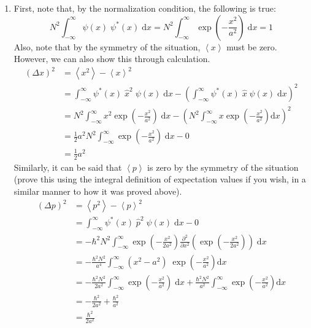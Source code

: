 \begin{sol}
\begin{enumerate}[label=\textbf{(\alph*)}]
\item First, note that, by the normalization condition, the following is true: $$N^2\int_{-\infty}^{\infty}\psi(x)\;\psi^*(x)\;\mathrm{d}x = N^2\int_{-\infty}^{\infty}\operatorname{exp}\left(-\frac{x^2}{a^2}\right)\;\mathrm{d}x = 1$$
Also, note that by the symmetry of the situation, $\left<x\right>$ must be zero. However, we can also show this through calculation.
\begin{align*}
    \left(\Delta x\right)^2 &= \left<x^2\right> - \left<x\right>^2\\ &= \int_{-\infty}^{\infty}\psi^*(x)\;\hat{x}^2\;\psi(x)\;\mathrm{d}x -\left(\int_{-\infty}^{\infty}\psi^*(x)\;\hat{x}\;\psi(x)\;\mathrm{d}x\right)^2\\ &= N^2\int_{-\infty}^{\infty}x^2\operatorname{exp}\left(-\frac{x^2}{a^2}\right)\;\mathrm{d}x -\left(N^2\int_{-\infty}^{\infty}x\operatorname{exp}\left(-\frac{x^2}{a^2}\right)\mathrm{d}x\right)^2\\ &= \frac{1}{2}a^2N^2\int_{-\infty}^{\infty}\operatorname{exp}\left(-\frac{x^2}{a^2}\right)\;\mathrm{d}x - 0 \\ &= \frac{1}{2}a^2
\end{align*}
Similarly, it can be said that $\left<p\right>$ is zero by the symmetry of the situation (prove this using the integral definition of expectation values if you wish, in a similar manner to how it was proved above).
\begin{align*}
\left(\Delta p\right)^2 &= \left<p^2\right> - \left<p\right>^2 \\ &= \int_{-\infty}^{\infty}\psi^*(x)\;\hat{p}^2\;\psi(x)\;\mathrm{d}x - 0 \\ &= -\hbar^2N^2\int_{-\infty}^{\infty}\operatorname{exp}\left(-\frac{x^2}{2a^2}\right)\frac{\partial^2}{\partial x^2}\left(\operatorname{exp}\left(-\frac{x^2}{2a^2}\right)\right)\;\mathrm{d}x \\ &= -\frac{\hbar^2N^2}{a^4}\int_{-\infty}^{\infty}(x^2-a^2)\;\operatorname{exp}\left(-\frac{x^2}{a^2}\right)\mathrm{d}x \\ &= -\frac{\hbar^2N^2}{2a^2}\int_{-\infty}^{\infty}\operatorname{exp}\left(-\frac{x^2}{a^2}\right)\;\mathrm{d}x + \frac{\hbar^2N^2}{a^2}\int_{-\infty}^{\infty}\operatorname{exp}\left(-\frac{x^2}{a^2}\right)\mathrm{d}x\\ &= -\frac{\hbar^2}{2a^2} + \frac{\hbar^2}{a^2} \\ &= \frac{\hbar^2}{2a^2}

\end{align*}
\end{enumerate}
\end{sol}
